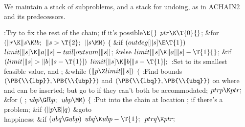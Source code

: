 We maintain a stack of subproblems, and a stack for
undoing,
as in {\mc ACHAIN2} and its predecessors.

\Y\B\4:Try to fix the rest of the chain;  if
it's possible\X${}\E{}$\6
$\\{ptr}\K\T{0}{}$;\6
\&{for} ${}(\|r\K\|s\K\\{lb};{}$ ${}\|s>\T{2};{}$ ${}\|s\MM){}$\5
${}\{{}$\1\6
\&{if} ${}(\\{outdeg}[\|s]\E\T{1}){}$\1\5
${}\\{limit}[\|s]\K\|a[\|s]-\\{tail}[\\{outsum}[\|s]]{}$;\5
\2\&{else}\1\5
${}\\{limit}[\|s]\K\|a[\|s]-\T{1}{}$;\2\6
\&{if} ${}(\\{limit}[\|s]>\|b[\|s-\T{1}]){}$\1\5
${}\\{limit}[\|s]\K\|b[\|s-\T{1}];{}$\2\6
:Set  to its smallest feasible value, and %
\X;\6
\&{while} ${}(\|p\Z\\{limit}[\|s]){}$\5
${}\{{}$\1\6
:Find bounds $(\PB{\\{lbp}},\PB{\\{ubp}})$ and $(\PB{\\{lbq}},\PB{%
\\{ubq}})$ on where  and  can be inserted; but go to  if they can't both be accommodated\X;\6
${}\\{ptrp}\K\\{ptr};{}$\6
\&{for} ( ; ${}\\{ubp}\G\\{lbp};{}$ ${}\\{ubp}\MM){}$\5
${}\{{}$\1\6
:Put  into the chain at location ;  if there's a problem\X;\6
\&{if} ${}(\|p\E\|q){}$\1\5
\&{goto} \\{happiness};\2\6
\&{if} ${}(\\{ubq}\G\\{ubp}){}$\1\5
${}\\{ubq}\K\\{ubp}-\T{1};{}$\2\6
${}\\{ptrq}\K\\{ptr};{}$\6
